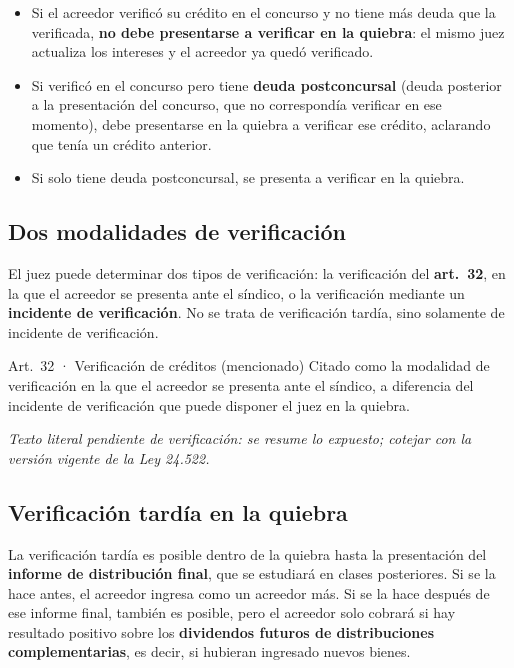 \documentclass[12pt,oneside]{book}
\begin{document}
\begin{itemize}
    \item Si el acreedor verificó su crédito en el concurso y no tiene más deuda que la verificada, \textbf{no debe presentarse a verificar en la quiebra}: el mismo juez actualiza los intereses y el acreedor ya quedó verificado.
    \item Si verificó en el concurso pero tiene \textbf{deuda postconcursal} (deuda posterior a la presentación del concurso, que no correspondía verificar en ese momento), debe presentarse en la quiebra a verificar ese crédito, aclarando que tenía un crédito anterior.
    \item Si solo tiene deuda postconcursal, se presenta a verificar en la quiebra.
\end{itemize}

\subsection{Dos modalidades de verificación}

El juez puede determinar dos tipos de verificación: la verificación del \textbf{art.~32}, en la que el acreedor se presenta ante el síndico, o la verificación mediante un \textbf{incidente de verificación}. No se trata de verificación tardía, sino solamente de incidente de verificación.

\begin{norma}{Art.~32 · Verificación de créditos (mencionado)}
Citado como la modalidad de verificación en la que el acreedor se presenta ante el síndico, a diferencia del incidente de verificación que puede disponer el juez en la quiebra.

\par\smallskip\textit{Texto literal pendiente de verificación: se resume lo expuesto; cotejar con la versión vigente de la Ley 24.522.}
\end{norma}

\subsection{Verificación tardía en la quiebra}

La verificación tardía es posible dentro de la quiebra hasta la presentación del \textbf{informe de distribución final}, que se estudiará en clases posteriores. Si se la hace antes, el acreedor ingresa como un acreedor más. Si se la hace después de ese informe final, también es posible, pero el acreedor solo cobrará si hay resultado positivo sobre los \textbf{dividendos futuros de distribuciones complementarias}, es decir, si hubieran ingresado nuevos bienes.
\end{document}
